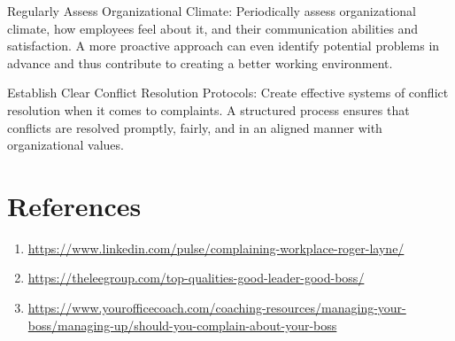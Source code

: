 \documentclass[a4paper,12pt]{report}
\begin{document}
Regularly Assess Organizational Climate:
Periodically assess organizational climate, how employees feel about it, and their communication abilities and satisfaction. A more proactive approach can even identify potential problems in advance and thus contribute to creating a better working environment.

Establish Clear Conflict Resolution Protocols:
Create effective systems of conflict resolution when it comes to complaints. A structured process ensures that conflicts are resolved promptly, fairly, and in an aligned manner with organizational values.


\chapter{References}
\begin{enumerate}
  \item \url{https://www.linkedin.com/pulse/complaining-workplace-roger-layne/}
   \item \url{https://theleegroup.com/top-qualities-good-leader-good-boss/}
     \item \url{https://www.yourofficecoach.com/coaching-resources/managing-your-boss/managing-up/should-you-complain-about-your-boss}
\end{enumerate}
\end{document}
